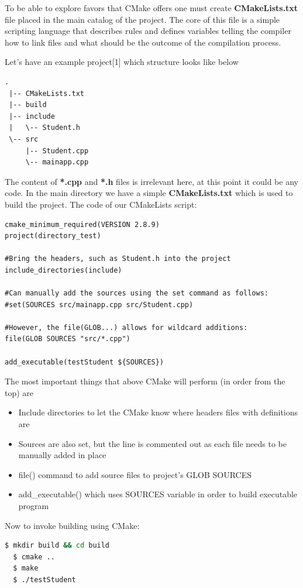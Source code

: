 \documentclass[a4paper,12pt]{article}
\begin{document}
{{\bigskip
To be able to explore favors that CMake offers one must create \textbf{CMakeLists.txt} file placed in the main catalog of the project. The core of this file is a simple scripting language that describes rules and defines variables telling the compiler how to link files and what should be the outcome of the compilation process.

\bigskip
Let's have an example project[1] which structure looks like below\newline
\begin{lstlisting}[frame=single]
 .
 |-- CMakeLists.txt
 |-- build
 |-- include
 |   \-- Student.h
 \-- src
     |-- Student.cpp
     \-- mainapp.cpp
\end{lstlisting}
\bigskip
The content of \textbf{*.cpp} and \textbf{*.h} files is irrelevant here, at this point it could be any code. In the main directory we have a simple \textbf{CMakeLists.txt} which is used to build the project. The code of our CMakeLists script:\newline

\begin{lstlisting}[frame=single]
cmake_minimum_required(VERSION 2.8.9)
project(directory_test)

#Bring the headers, such as Student.h into the project
include_directories(include)

#Can manually add the sources using the set command as follows:
#set(SOURCES src/mainapp.cpp src/Student.cpp)

#However, the file(GLOB...) allows for wildcard additions:
file(GLOB SOURCES "src/*.cpp")

add_executable(testStudent ${SOURCES})
\end{lstlisting}
\bigskip
The most important things that above CMake will perform (in order from the top) are
\begin{itemize}
	\item Include directories to let the CMake know where headers files with definitions are
	\item Sources are also set, but the line is commented out as each file needs to be manually added in place
	\item file() command to add source files to project's GLOB SOURCES
	\item add\_executable() which uses SOURCES variable in order to build executable program
\end{itemize}


\noindent Now to invoke building using CMake:
\begin{lstlisting}[language=bash]
  $ mkdir build && cd build
  $ cmake ..
  $ make
  $ ./testStudent
\end{lstlisting}
  
}}
\end{document}
